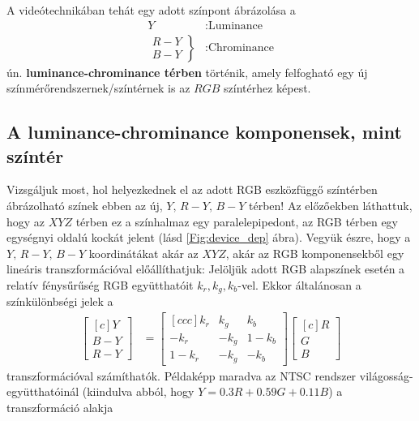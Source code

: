 A videótechnikában tehát egy adott színpont ábrázolása a
\begin{align*}
Y&: \text{Luminance }\\
 	\left.\begin{array}{lr}
        R-Y\\
        B-Y
        \end{array}\right\}&: \text{Chrominance}
\end{align*}
ún. \textbf{luminance-chrominance térben} történik, amely felfogható egy új színmérőrendszernek/színtérnek is az $RGB$ színtérhez képest.

\subsection{A luminance-chrominance komponensek, mint színtér}
Vizsgáljuk most, hol helyezkednek el az adott RGB eszközfüggő színtérben ábrázolható színek ebben az új, $Y,\, R-Y,\, B-Y$ térben!
Az előzőekben láthattuk, hogy az $XYZ$ térben ez a színhalmaz egy paralelepipedont, az RGB térben egy egységnyi oldalú kockát jelent (lásd \ref{Fig:device_dep} ábra).
Vegyük észre, hogy a $Y,\, R-Y,\, B-Y$ koordinátákat akár az $XYZ$, akár az RGB komponensekből egy lineáris transzformációval előállíthatjuk:
Jelöljük adott RGB alapszínek esetén a relatív fénysűrűség RGB együtthatóit $k_r, k_g, k_b$-vel.
Ekkor általánosan a színkülönbségi jelek a 
\begin{align}
\begin{bmatrix}[c]
       Y \\[0.3em]
       B - Y \\[0.3em]
       R - Y\end{bmatrix} &= 
\begin{bmatrix}[c c c]
      k_r &  k_g&  k_b  \\[0.3em]
      -k_r &  -k_g&  1-k_b  \\[0.3em]
      1-k_r &  -k_g&  -k_b \end{bmatrix} 
\begin{bmatrix}[c]
       R \\[0.3em]
       G \\[0.3em]
       B \end{bmatrix}
\end{align}
transzformációval számíthatók.
Példaképp maradva az NTSC rendszer világosság-együtthatóinál (kiindulva abból, hogy $Y = 0.3R + 0.59G + 0.11B$) a transzformáció alakja
